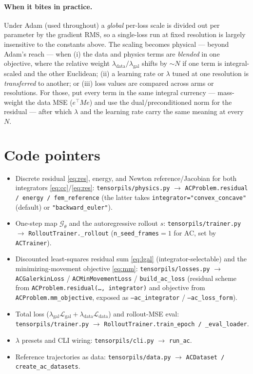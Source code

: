 \documentclass[11pt]{article}
\begin{document}
\paragraph{When it bites in practice.} Under Adam (used throughout) a \emph{global} per-loss scale
is divided out per parameter by the gradient RMS, so a single-loss run at fixed resolution is
largely insensitive to the constants above. The scaling becomes physical --- beyond Adam's reach
--- when (i) the data and physics terms are \emph{blended} in one objective, where the relative
weight $\lambda_{\mathrm{data}}/\lambda_{\mathrm{gal}}$ shifts by $\sim N$ if one term is
integral-scaled and the other Euclidean; (ii) a learning rate or $\lambda$ tuned at one resolution
is \emph{transferred} to another; or (iii) loss values are compared across arms or resolutions. For
those, put every term in the same integral currency --- mass-weight the data MSE ($e^\top Me$) and
use the dual/preconditioned norm for the residual --- after which $\lambda$ and the learning rate
carry the same meaning at every $N$.

\section{Code pointers}

\begin{itemize}\itemsep2pt
  \item Discrete residual \eqref{eq:res}, energy, and Newton reference/Jacobian for both
        integrators \eqref{eq:cc}/\eqref{eq:res}:
        \texttt{tensorpils/physics.py} $\to$ \texttt{ACProblem.residual / energy / fem\_reference}
        (the latter takes \texttt{integrator="convex\_concave"} (default) or \texttt{"backward\_euler"}).
  \item One-step map $\mathcal G_\theta$ and the autoregressive rollout $s$:
        \texttt{tensorpils/trainer.py} $\to$ \texttt{RolloutTrainer.\_rollout}
        (\texttt{n\_seed\_frames}$=1$ for AC, set by \texttt{ACTrainer}).
  \item Discounted least-squares residual sum \eqref{eq:lgal} (integrator-selectable) and the
        minimizing-movement objective \eqref{eq:mm}:
        \texttt{tensorpils/losses.py} $\to$ \texttt{ACGalerkinLoss} / \texttt{ACMinMovementLoss}
        / \texttt{build\_ac\_loss} (residual scheme from \texttt{ACProblem.residual(\dots, integrator)}
        and objective from \texttt{ACProblem.mm\_objective}, exposed as \texttt{--ac\_integrator} /
        \texttt{--ac\_loss\_form}).
  \item Total loss ($\lambda_{\mathrm{gal}}\mathcal L_{\mathrm{gal}}+\lambda_{\mathrm{data}}\mathcal L_{\mathrm{data}}$)
        and rollout-MSE eval:
        \texttt{tensorpils/trainer.py} $\to$ \texttt{RolloutTrainer.train\_epoch / \_eval\_loader}.
  \item $\lambda$ presets and CLI wiring:
        \texttt{tensorpils/cli.py} $\to$ \texttt{run\_ac}.
  \item Reference trajectories as data:
        \texttt{tensorpils/data.py} $\to$ \texttt{ACDataset / create\_ac\_datasets}.
\end{itemize}
\end{document}
